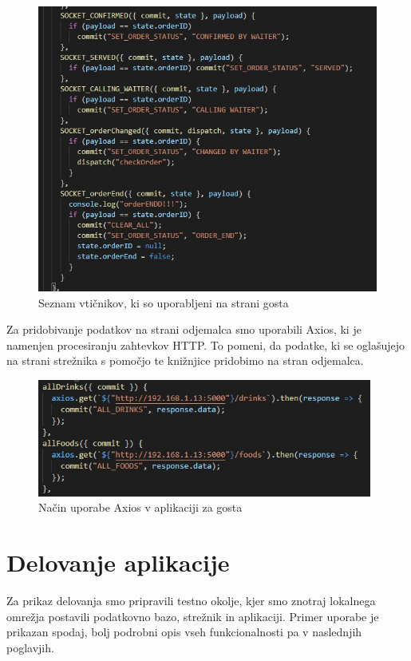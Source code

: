 \documentclass[a4paper, 12pt]{book}
\begin{document}
\begin{figure}[!htb]
\begin{center}
\includegraphics[width=12cm]{socketio_1.jpg}
\caption{Seznam vtičnikov, ki so uporabljeni na strani gosta}
\end{center}
\label{SocketIO_1}
\end{figure}


Za pridobivanje podatkov na strani odjemalca smo uporabili Axios, ki je namenjen procesiranju zahtevkov  HTTP. To pomeni, da podatke, ki se oglašujejo na strani strežnika s pomočjo te knižnjice pridobimo na stran odjemalca. 

\begin{figure}[!htb]
\begin{center}
\includegraphics[width=11cm]{axios_1.jpg}
\caption{Način uporabe Axios v aplikaciji za gosta}
\end{center}
\label{axios_1}
\end{figure}


\chapter {Delovanje aplikacije}
Za prikaz delovanja smo pripravili testno okolje, kjer smo znotraj lokalnega omrežja postavili podatkovno bazo, strežnik in aplikaciji. Primer uporabe je prikazan spodaj, bolj podrobni opis vseh funkcionalnosti pa v naslednjih poglavjih.
\end{document}
